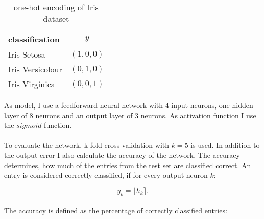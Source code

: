 \begin{table}[tb]
  \centering
  \begin{tabular}[c]{lc}
    \hline
    classification			& $y$ 					\\
    \hline
    Iris Setosa 				& $(1, 0, 0)$		\\
    Iris Versicolour 		& $(0, 1, 0)$		\\
    Iris Virginica 			& $(0, 0, 1)$		\\
    \hline
  \end{tabular}
  \caption{one-hot encoding of Iris dataset}
  \label{tab:iris_encoding}
\end{table}


As model, I use a feedforward neural network with 4 input neurons, one hidden layer of 8 neurons and an output layer of 3 neurons. As activation function I use the $sigmoid$ function. 
\\
\\
To evaluate the network, k-fold cross validation with $k=5$ is used. In addition to the output error I also calculate the accuracy of the network. The accuracy determines, how much of the entries from the test set are classified correct. An entry is considered correctly classified, if for every output neuron $k$: 

\begin{equation*}
y_k =\lfloor h_k \rceil.
\end{equation*}
\\
The accuracy is defined as the percentage of correctly classified entries:

